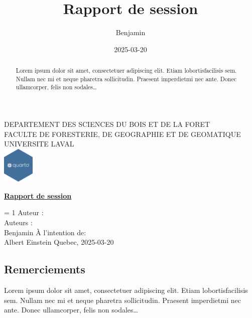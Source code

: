 \documentclass[
  12pt,
]{article}
\title{Rapport de session}
\author{Benjamin}
\date{2025-03-20}
\begin{document}
  
  \begin{titlepage} 
      \centering
      {\large DEPARTEMENT DES SCIENCES DU BOIS ET DE LA FORET \\}
      {\large FACULTE DE FORESTERIE, DE GEOGRAPHIE ET DE GEOMATIQUE \\}
      {\large UNIVERSITE LAVAL \\}
          \includegraphics[width=1.5cm]{logo-quarto} \\
      
      \vfill %
      {\Huge\bfseries\underline {Rapport de session} \par}
      \vfill %
               = 1
              {\Large Auteur : \\}
          \else
              {\Large Auteurs : \\}
          \fi
          {\large {Benjamin}}
          \vfill
      {\Large À l'intention de: \\ {Albert Einstein}}
      \vfill
      {\large Quebec, {2025-03-20}}
  \end{titlepage}

  \renewcommand{\abstractname}{\section*{Résumé}\label{ruxe9sumuxe9}}
  \begin{abstract}
    \begin{center}
      Lorem ipsum dolor sit amet, consectetuer adipiscing elit. Etiam
      lobortisfacilisis sem. Nullam nec mi et neque pharetra
      sollicitudin. Praesent imperdietmi nec ante. Donec ullamcorper,
      felis non sodales\ldots{}
    \end{center}
    {\newpage}
  \end{abstract}

  \begin{center}
    \section*{Remerciements}\label{remerciement}
    Lorem ipsum dolor sit amet, consectetuer adipiscing elit. Etiam
    lobortisfacilisis sem. Nullam nec mi et neque pharetra sollicitudin.
    Praesent imperdietmi nec ante. Donec ullamcorper, felis non
    sodales\ldots{}
  \end{center}
  {\newpage}
\end{document}
